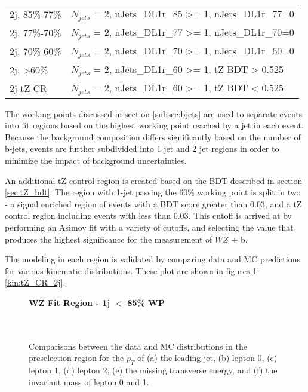 \begin{table}[h]
\begin{tabular}{l|l}
2j, 85\%-77\%   & $N_{jets}$ = 2, nJets\_DL1r\_85 >= 1, nJets\_DL1r\_77=0                     \\
2j, 77\%-70\%   & $N_{jets}$ = 2, nJets\_DL1r\_77 >= 1, nJets\_DL1r\_70=0                     \\
2j, 70\%-60\%   & $N_{jets}$ = 2, nJets\_DL1r\_70 >= 1, nJets\_DL1r\_60=0                      \\
2j, >60\%       & $N_{jets}$ = 2, nJets\_DL1r\_60 >= 1, tZ BDT > 0.525 \\
2j tZ CR        & $N_{jets}$ = 2, nJets\_DL1r\_60 >= 1, tZ BDT < 0.525 \\
\hline\hline
\end{tabular}
\label{tab:regions}
\end{table}

The working points discussed in section \ref{subsec:bjets} are used to separate events into fit regions based on the highest working point reached by a jet in each event. Because the background composition differs significantly based on the number of b-jets, events are further subdivided into 1 jet and 2 jet regions in order to minimize the impact of background uncertainties.

An additional tZ control region is created based on the BDT described in section \ref{sec:tZ_bdt}. The region with 1-jet passing the 60\% working point is split in two - a signal enriched region of events with a BDT score greater than 0.03, and a tZ control region including events with less than 0.03. This cutoff is arrived at by performing an Asimov fit with a variety of cutoffs, and selecting the value that produces the highest significance for the measurement of $WZ$ + b.

The modeling in each region is validated by comparing data and MC predictions for various kinematic distributions. These plot are shown in figures \ref{kin:WP_1j_not85}-\ref{kin:tZ_CR_2j}.

\begin{figure}[H]
    \centering
    \textbf{WZ Fit Region - 1j $<$ 85\% WP}\\
    \\
    \\
    \caption{Comparisons between the data and MC distributions in the preselection region for the $p_T$ of (a) the leading jet, (b) lepton 0, (c) lepton 1, (d) lepton 2, (e) the missing transverse energy, and (f) the invariant mass of lepton 0 and 1.}
    \label{kin:WP_1j_not85}
\end{figure}

